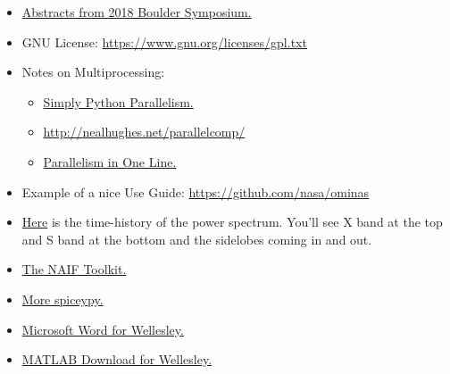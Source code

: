 \documentclass[crop=false,class=article,oneside]{standalone}
\begin{document}
\begin{itemize}[itemsep=0pt]
                \item \href{http://lasp.colorado.edu/media/%
                            projects/cassini/docs/%
                            Cassini_Science_Symposium_2018_%
                            Program-LowResForWeb.pdf}
                           {Abstracts from 2018 Boulder Symposium.}
                \item GNU License:
                      \url{https://www.gnu.org/licenses/gpl.txt}
                \item Notes on Multiprocessing:
                \begin{itemize}
                    \item \href{https://stsievert.com/blog/2014/07/30/%
                                simple-python-parallelism/}
                               {Simply Python Parallelism.}
                    \item \url{http://nealhughes.net/parallelcomp/}
                    \item \href{http://chriskiehl.com/article/%
                                parallelism-in-one-line/}
                               {Parallelism in One Line.}
                \end{itemize}
                \item Example of a nice Use Guide:
                      \url{https://github.com/nasa/ominas}
                \item \href{https://www.youtube.com/%
                            watch?time_continue=2&v=s-Xw6i61N9o}
                           {Here}
                      is the time-history of the power spectrum.
                      You'll see X band at the top and S band at
                      the bottom and the sidelobes coming in and out.
                \item \href{https://naif.jpl.nasa.gov/naif/toolkit.html}
                           {The NAIF Toolkit.}
                \item \href{http://spiceypy.readthedocs.io/en/%
                            master/exampleone.html}
                           {More spiceypy.}
                \item \href{http://www.wellesley.edu/lts/%
                            office365\#38MbQkK5QQom6URk.97}
                           {Microsoft Word for Wellesley.}
                \item \href{http://www.wellesley.edu/lts/%
                            techsupport/macs\#OyZifeYOQ4rso8ep.97}
                           {MATLAB Download for Wellesley.}
            \end{itemize}
\end{document}
